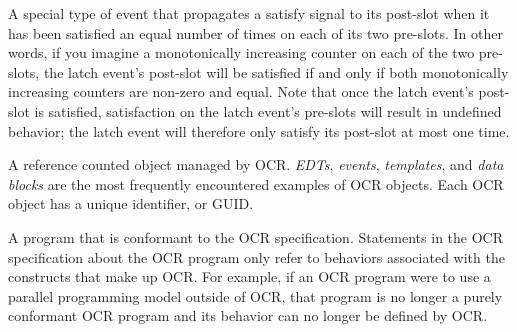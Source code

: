\glossarydefstart
A special type of event that propagates a satisfy signal to its post-slot
when it has been satisfied an equal number of times on each of its two
pre-slots. In other words, if you imagine a
monotonically increasing counter on each of the two pre-slots, the
latch event's post-slot will be satisfied if and only if both monotonically
increasing counters are non-zero and equal. Note that once the latch
event's post-slot is satisfied, satisfaction on the latch event's
pre-slots will result in undefined behavior; the latch event will
therefore only satisfy its post-slot at most one time.
\glossarydefend

%
%
%

%
%

\glossarydefstart
A reference counted object managed by OCR. \emph{EDTs}, \emph{events},
\emph{templates}, and \emph{data blocks} are the most frequently
encountered examples of OCR objects. Each OCR object has a unique
identifier, or GUID.
\glossarydefend

\glossarydefstart
A program that is conformant to the OCR specification. Statements in
the OCR specification about the OCR program only refer to behaviors
associated with the constructs that make up OCR. For example, if an
OCR program were to use a parallel programming model outside of OCR,
that program is no longer a purely conformant OCR program and its
behavior can no longer be defined by OCR.
\glossarydefend

